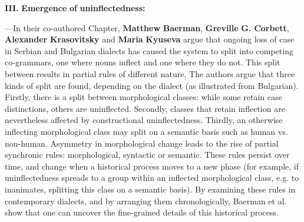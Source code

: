 \documentclass[output=paper]{langscibook}
\begin{document}
\textbf{III.} \textbf{Emergence} \textbf{of} \textbf{uninflectedness:} 

—In their co-authored Chapter, \textbf{Matthew} \textbf{Baerman}, \textbf{Greville} \textbf{G.} \textbf{Corbett}, \textbf{Alexander} \textbf{Krasovitsky} and \textbf{Maria} \textbf{Kyuseva} argue that ongoing loss of case in Serbian and Bulgarian dialects has caused the system to split into competing co-grammars, one where nouns inflect and one where they do not. This split between results in partial rules of different nature. The authors argue that three kinds of split are found, depending on the dialect (as illustrated from Bulgarian). Firstly, there is a split between morphological classes: while some retain case distinctions, others are uninflected. Secondly, classes that retain inflection are nevertheless affected by constructional uninflectedness. Thirdly, an otherwise inflecting morphological class may split on a semantic basis such as human vs. non-human. Asymmetry in morphological change leads to the rise of partial synchronic rules: morphological, syntactic or semantic.  These rules persist over time, and change when a historical process moves to a new phase (for example, if uninflectedness spreads to a group within an inflected morphological class, e.g. to inanimates, splitting this class on a semantic basis). By examining these rules in contemporary dialects, and by arranging them chronologically, Baerman et al. show that one can uncover the fine-grained details of this historical process.
\end{document}
